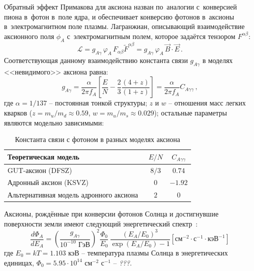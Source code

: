 \documentclass[a4paper,article,14pt]{extarticle}
\begin{document}
Обратный эффект Примакова для аксиона назван по~аналогии с~конверсией пиона в~фотон в~поле ядра, и обеспечивает конверсию фотонов в~аксионы в~электромагнитном поле плазмы.
Лагранжиан, описывающий взаимодействие аксионного поля $\phi_A$ с~электромагнитным полем, которое задаётся тензором $F^{\alpha \beta}$:
\begin{equation}
    \mathcal{L} =
    g_{A\gamma}\, \varphi_A\, F_{\alpha\beta} \tilde{F}^{\alpha\beta} =
    g_{A\gamma}\, \varphi_A\,\vec{B} \cdot \vec{E}\, .
\end{equation}
Соответствующая данному взаимодействию константа связи $g_{A\gamma}$ в моделях <<невидимого>> аксиона равна:
\begin{equation}\label{gAy}
    g_{A\gamma} =
    \frac{\alpha}{2 \pi {f_A}}
    \left[
        \frac{E}{N} - \frac{2}{3} \frac{(4 + z)}{(1 + z)}
        \right] =
    \frac{\alpha}{2 \pi {f_A}} C_{A\gamma\gamma}\, ,
\end{equation}
где $\alpha = 1/137 $ -- постоянная тонкой структуры; $z$ и $w$ -- отношения масс легких кварков ($z = m_u/m_d \approx 0.59$, $w = m_u/m_s \approx 0.029$); остальные параметры являются модельно зависимыми:
\begin{table}[t]
    \centering
    \begin{tabular}{|l|c|c|}
        \hline
        Теоретическая модель                                    & $E/N$ & $C_{A\gamma\gamma}$ \\
        \hline
        \hline
        GUT-аксион (DFSZ)                                       & $8/3$ & $0.74$              \\
        \hline
        Адронный аксион (KSVZ)                                  & $0$   & $-1.92$             \\
        \hline
        Альтернативная модель адронного аксиона~\cite{hadronic2} & $2$   & $0$                 \\
        \hline
    \end{tabular}
    \caption{Константа связи с фотоном в разных моделях аксиона}\label{tab:gay}
\end{table}\newline
Аксионы, рождённые при конверсии фотонов Солнца и достигнувшие поверхности земли имеют следующий энергетический спектр~\cite{solarflux1,solarflux2,solarflux3}:
\begin{equation}
    \frac{d \Phi_A}{d E_A} =
    \left(
    \frac{g_{A\gamma}}{10^{-10} \text{\ ГэВ}}
    \right)^2
    \frac{\Phi_0}{E_0}\,
    \frac{(E_A / E_0)^3}{\exp(E_A / E_0) - 1}
    \left[
        \text{см}^{-2} \cdot \text{с}^{-1} \cdot \text{кэВ}^{-1}
        \right]
\end{equation}
где ${E_0} = kT = 1.103 \text{\ кэВ}$ -- температура плазмы Солнца в энергетических единицах, ${{\Phi _0}} = 5.95 \cdot 10^{14} \text{ см} ^{-2} \text{ с} ^{-1}$ -- \emph{???}.
\end{document}
